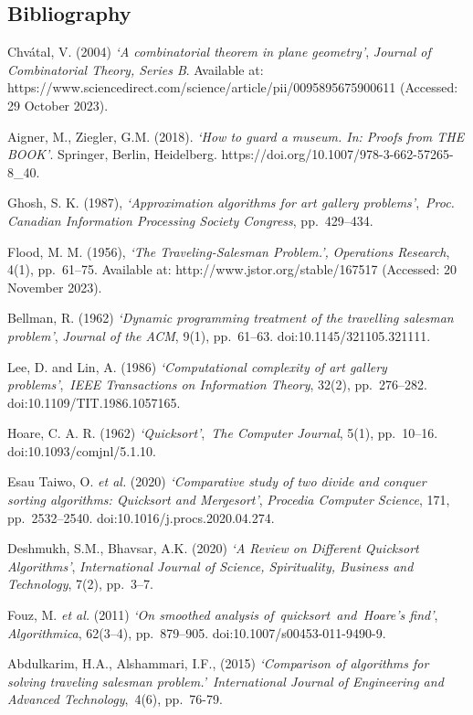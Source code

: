 \documentclass[
]{article}
\begin{document}
\newpage

\subsection{Bibliography}\label{bibliography}

Chvátal, V. (2004) \emph{`A combinatorial theorem in plane geometry'},
\emph{Journal of Combinatorial Theory, Series B}. Available at:
https://www.sciencedirect.com/science/article/pii/0095895675900611
(Accessed: 29 October 2023).

Aigner, M., Ziegler, G.M. (2018). \emph{`How to guard a museum. In:
Proofs from THE BOOK'}. Springer, Berlin, Heidelberg.
https://doi.org/10.1007/978-3-662-57265-8\_40.

Ghosh, S. K. (1987), \emph{`Approximation algorithms for art gallery
problems'},~\emph{Proc. Canadian Information Processing Society
Congress}, pp.~429--434.

Flood, M. M. (1956), \emph{`The Traveling-Salesman Problem.',}
\emph{Operations Research}, 4(1), pp.~61--75. Available at:
http://www.jstor.org/stable/167517 (Accessed: 20 November 2023).

Bellman, R. (1962) \emph{`Dynamic programming treatment of the
travelling salesman problem'}, \emph{Journal of the ACM}, 9(1),
pp.~61--63. doi:10.1145/321105.321111.

Lee, D. and Lin, A. (1986) \emph{`Computational complexity of art
gallery problems'},~\emph{IEEE Transactions on Information Theory},
32(2), pp.~276--282. doi:10.1109/TIT.1986.1057165.

Hoare, C. A. R. (1962) \emph{`Quicksort'},~\emph{The Computer Journal},
5(1), pp.~10--16. doi:10.1093/comjnl/5.1.10.

Esau Taiwo, O. \emph{et al.} (2020) \emph{`Comparative study of two
divide and conquer sorting algorithms: Quicksort and Mergesort'},
\emph{Procedia Computer Science}, 171, pp.~2532--2540.
doi:10.1016/j.procs.2020.04.274.

Deshmukh, S.M., Bhavsar, A.K. (2020) \emph{`A Review on Different
Quicksort Algorithms'}, \emph{International Journal of Science,
Spirituality, Business and Technology}, 7(2), pp.~3--7.

Fouz, M. \emph{et al.} (2011) \emph{`On smoothed analysis
of~quicksort~and~Hoare's find'}, \emph{Algorithmica}, 62(3--4),
pp.~879--905. doi:10.1007/s00453-011-9490-9.

Abdulkarim, H.A., Alshammari, I.F., (2015) \emph{`Comparison of
algorithms for solving traveling salesman problem.'}~\emph{International
Journal of Engineering and Advanced Technology},~4(6), pp.~76-79.
\end{document}
